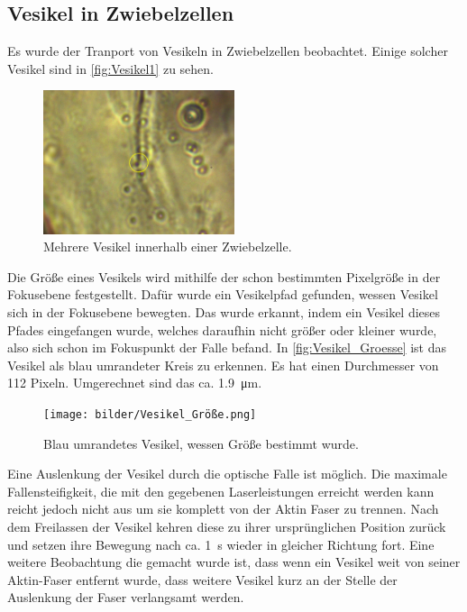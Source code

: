 \subsection{Vesikel in Zwiebelzellen}
    Es wurde der Tranport von Vesikeln in Zwiebelzellen beobachtet.
    Einige solcher Vesikel sind in \autoref{fig:Vesikel1} zu sehen.
    \begin{figure}[ht]
        \centering\captionsetup{format=plain}
        \includegraphics[width=0.5\textwidth]{bilder/Vesikel1.JPG}
        \caption{Mehrere Vesikel innerhalb einer Zwiebelzelle.}
        \label{fig:Vesikel1}
    \end{figure}
    \FloatBarrier
    Die Größe eines Vesikels wird mithilfe der schon bestimmten Pixelgröße in der Fokusebene festgestellt.
    Dafür wurde ein Vesikelpfad gefunden, wessen Vesikel sich in der Fokusebene bewegten.
    Das wurde erkannt, indem ein Vesikel dieses Pfades eingefangen wurde, welches daraufhin nicht größer oder kleiner wurde, also sich schon im Fokuspunkt der Falle befand.
    In \autoref{fig:Vesikel_Groesse} ist das Vesikel als blau umrandeter Kreis zu erkennen.
    Es hat einen Durchmesser von 112 Pixeln.
    Umgerechnet sind das ca. \qty{1.9}{\um}.
    \begin{figure}[ht]
        \centering\captionsetup{format=plain}
        \texttt{[image: bilder/Vesikel\_Größe.png]}
        \caption{Blau umrandetes Vesikel, wessen Größe bestimmt wurde.}
        \label{fig:Vesikel_Groesse}
    \end{figure}
    \FloatBarrier
    Eine Auslenkung der Vesikel durch die optische Falle ist möglich.
    Die maximale Fallensteifigkeit, die mit den gegebenen Laserleistungen erreicht werden kann reicht jedoch nicht aus um sie komplett von der Aktin Faser zu trennen.
    Nach dem Freilassen der Vesikel kehren diese zu ihrer ursprünglichen Position zurück und setzen ihre Bewegung nach ca. \qty{1}{s} wieder in gleicher Richtung fort.
    Eine weitere Beobachtung die gemacht wurde ist, dass wenn ein Vesikel weit von seiner Aktin-Faser entfernt wurde, dass weitere Vesikel kurz an der Stelle der Auslenkung der Faser verlangsamt werden.

